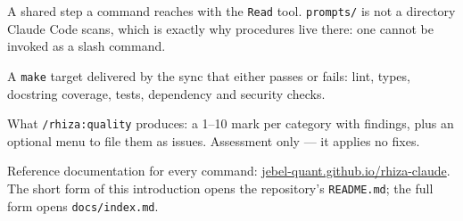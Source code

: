 \documentclass[11pt,a4paper]{article}
\newcommand{\cmd}[1]{\texttt{/rhiza:#1}}
\newcommand{\file}[1]{\texttt{#1}}
\begin{document}
\begin{description}[leftmargin=0pt, style=nextline, itemsep=0.3em]
        A shared step a command reaches with the \texttt{Read} tool. \file{prompts/} is
        not a directory Claude Code scans, which is exactly why procedures live there:
        one cannot be invoked as a slash command.
  \item[gate]
        A \texttt{make} target delivered by the sync that either passes or fails: lint,
        types, docstring coverage, tests, dependency and security checks.
  \item[scorecard]
        What \cmd{quality} produces: a 1--10 mark per category with findings, plus an
        optional menu to file them as issues. Assessment only --- it applies no fixes.
\end{description}

\bigskip
\noindent
\small\color{slate}
Reference documentation for every command:
\href{https://jebel-quant.github.io/rhiza-claude/}{jebel-quant.github.io/rhiza-claude}.
The short form of this introduction opens the repository's \file{README.md}; the full
form opens \file{docs/index.md}.
\end{document}
